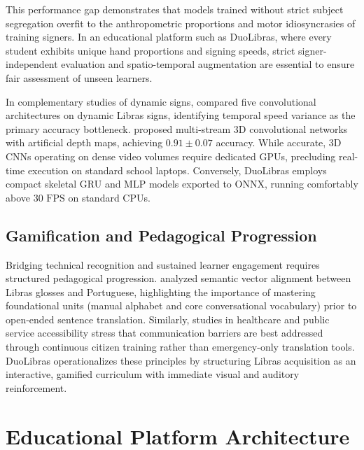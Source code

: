 \documentclass[12pt,a4paper]{article}
\newcommand{\citeonline}[1]{\citet{#1}}
\begin{document}
This performance gap demonstrates that models trained without strict subject segregation overfit to the anthropometric proportions and motor idiosyncrasies of training signers. In an educational platform such as DuoLibras, where every student exhibits unique hand proportions and signing speeds, strict signer-independent evaluation and spatio-temporal augmentation are essential to ensure fair assessment of unseen learners.

In complementary studies of dynamic signs, \citeonline{rodrigues2025dynamic} compared five convolutional architectures on dynamic Libras signs, identifying temporal speed variance as the primary accuracy bottleneck. \citeonline{castro2023multistream} proposed multi-stream 3D convolutional networks with artificial depth maps, achieving $0.91 \pm 0.07$ accuracy. While accurate, 3D CNNs operating on dense video volumes require dedicated GPUs, precluding real-time execution on standard school laptops. Conversely, DuoLibras employs compact skeletal GRU and MLP models exported to ONNX, running comfortably above $30\text{ FPS}$ on standard CPUs.

\subsection{Gamification and Pedagogical Progression}

Bridging technical recognition and sustained learner engagement requires structured pedagogical progression. \citeonline{pereira2026semantic} analyzed semantic vector alignment between Libras glosses and Portuguese, highlighting the importance of mastering foundational units (manual alphabet and core conversational vocabulary) prior to open-ended sentence translation. Similarly, studies in healthcare and public service accessibility \citep{dasilva2020health,passos2021gei} stress that communication barriers are best addressed through continuous citizen training rather than emergency-only translation tools. DuoLibras operationalizes these principles by structuring Libras acquisition as an interactive, gamified curriculum with immediate visual and auditory reinforcement.


\section{Educational Platform Architecture}
\label{sec:platform}
\end{document}
